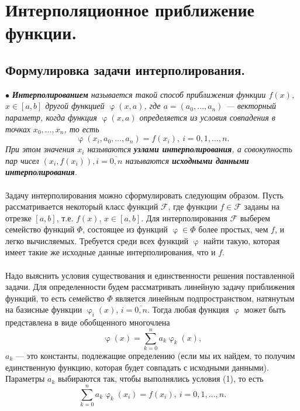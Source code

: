 \documentclass[a4paper, 12pt]{report}
\numberwithin{equation}{section}
\renewcommand{\varphi}{\upvarphi}
\begin{document}
 	 	\section{Интерполяционное приближение функции.}
 	 	\subsection{Формулировка задачи интерполирования.}
 	 	$\bullet$ \textit{\textbf{Интерполированием} называется такой способ приближения функции $f(x)$, $x\in [a,b]$ другой функцией $\varphi(x,a)$, где $a = (a_0,\ldots, a_n)$ --- векторный параметр, когда функция $\varphi(x,a)$ определяется из условия совпадения в точках $x_0,\ldots, x_n$, то есть
 	 	\begin{equation}
 	 		\varphi(x_i,a_0,\ldots, a_n) = f(x_i),\ i =0,1,\ldots, n.
 	 	\end{equation}
 	 	При этом значения $x_i$ называются \textbf{узлами интерполирования}, а совокупность пар чисел $(x_i, f(x_i)), i = \overline{0,n}$ называются \textbf{исходными данными интерполирования}.}\\\\
 	 	Задачу интерполирования можно сформулировать следующим образом. Пусть рассматривается некоторый класс функций $\mathcal F$, где функции $f\in \mathcal F$ заданы на отрезке $[a,b]$, т.е. $f(x)$, $x\in [a,b]$. Для интерполирования $\mathcal F$ выберем семейство функций $\Phi$, состоящее из функций $\varphi \in \Phi$  более простых, чем $f$, и легко вычисляемых. 
 	 	Требуется среди всех функций $\varphi$ найти такую, которая имеет такие же исходные данные интерполирования, что и $f$.
 	 	\\\\ 
 	 	Надо выяснить условия существования и единственности решения поставленной задачи. Для определенности будем рассматривать линейную задачу приближения функций, то есть семейство $\Phi$ является линейным подпространством, натянутым на базисные функции $\varphi_i(x)$, $i=\overline{0,n}$. Тогда любая функция $\varphi$ может быть представлена в виде обобщенного многочлена 
 	 	\begin{equation}
 	 		\varphi(x) = \sum_{k=0}^n a_k \varphi_k(x),
 	 	\end{equation}
 	 	$a_k$ --- это константы, подлежащие определению (если мы их найдем, то получим единственную функцию, которая будет совпадать с исходными данными). Параметры $a_k$ выбираются так, чтобы выполнялись условия (1), то есть 
 	 	\begin{equation}
 	 		\sum_{k=0}^{n}a_k\varphi_k(x_i) = f(x_i),\ i =0,1,\ldots, n.
 	 	\end{equation}
\end{document}
